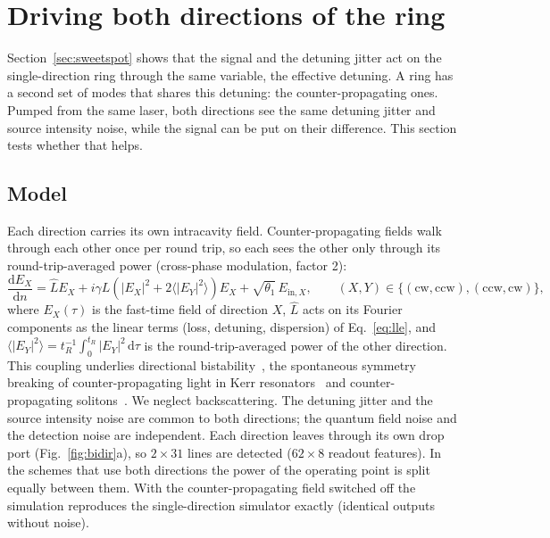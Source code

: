 \section{Driving both directions of the ring}\label{sec:bidir}

Section~\ref{sec:sweetspot} shows that the signal and the detuning jitter act on the single-direction ring through the same
variable, the effective detuning. A ring has a second set of modes that shares this detuning: the counter-propagating ones. Pumped
from the same laser, both directions see the same detuning jitter and source intensity noise, while the signal can be put on their
difference. This section tests whether that helps.

\subsection{Model}

Each direction carries its own intracavity field. Counter-propagating fields walk through each other once per round trip, so each
sees the other only through its round-trip-averaged power (cross-phase modulation, factor 2):
\begin{equation}
\frac{\mathrm{d}E_X}{\mathrm{d}n} = \hat{L}E_X + i\gamma L\left(|E_X|^2 + 2\langle|E_Y|^2\rangle\right)E_X + \sqrt{\theta_1}\,E_{\mathrm{in},X},
\qquad (X,Y)\in\{(\mathrm{cw},\mathrm{ccw}),(\mathrm{ccw},\mathrm{cw})\},
\label{eq:bidir}
\end{equation}
where $E_X(\tau)$ is the fast-time field of direction $X$, $\hat L$ acts on its Fourier components as the linear terms (loss, detuning,
dispersion) of Eq.~\eqref{eq:lle}, and $\langle|E_Y|^2\rangle=t_R^{-1}\int_0^{t_R}|E_Y|^2\,\mathrm{d}\tau$ is the round-trip-averaged power
of the other direction. This coupling underlies directional bistability~\cite{kaplan1982}, the spontaneous symmetry breaking of
counter-propagating light in Kerr resonators~\cite{delbino2017} and counter-propagating solitons~\cite{yang2017}. We neglect backscattering. The detuning
jitter and the source intensity noise are common to both directions; the quantum field noise and the detection noise are
independent. Each direction leaves through its own drop port (Fig.~\ref{fig:bidir}a), so $2\times31$ lines are detected ($62\times8$ readout features). In the
schemes that use both directions the power of the operating point is split equally between them. With the counter-propagating field
switched off the simulation reproduces the single-direction simulator exactly (identical outputs without noise).

